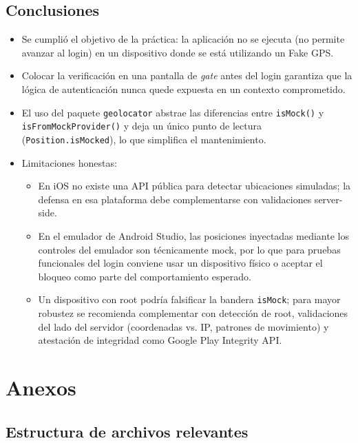 \documentclass[12pt, a4paper]{article}
\begin{document}
\subsection{Conclusiones}
\begin{itemize}
    \item Se cumplió el objetivo de la práctica: la aplicación no se
    ejecuta (no permite avanzar al login) en un dispositivo donde se
    está utilizando un Fake GPS.
    \item Colocar la verificación en una pantalla de \textit{gate} antes
    del login garantiza que la lógica de autenticación nunca quede
    expuesta en un contexto comprometido.
    \item El uso del paquete \texttt{geolocator} abstrae las diferencias
    entre \texttt{isMock()} y \texttt{isFromMockProvider()} y deja un
    único punto de lectura (\texttt{Position.isMocked}), lo que simplifica
    el mantenimiento.
    \item Limitaciones honestas:
    \begin{itemize}
        \item En iOS no existe una API pública para detectar
        ubicaciones simuladas; la defensa en esa plataforma debe
        complementarse con validaciones server-side.
        \item En el emulador de Android Studio, las posiciones
        inyectadas mediante los controles del emulador son técnicamente
        mock, por lo que para pruebas funcionales del login conviene
        usar un dispositivo físico o aceptar el bloqueo como parte
        del comportamiento esperado.
        \item Un dispositivo con root podría falsificar la bandera
        \texttt{isMock}; para mayor robustez se recomienda
        complementar con detección de root, validaciones del lado
        del servidor (coordenadas vs. IP, patrones de movimiento) y
        atestación de integridad como Google Play Integrity API.
    \end{itemize}
\end{itemize}

\clearpage

\section{Anexos}
\label{sec:anexos}

\subsection{Estructura de archivos relevantes}
\end{document}
